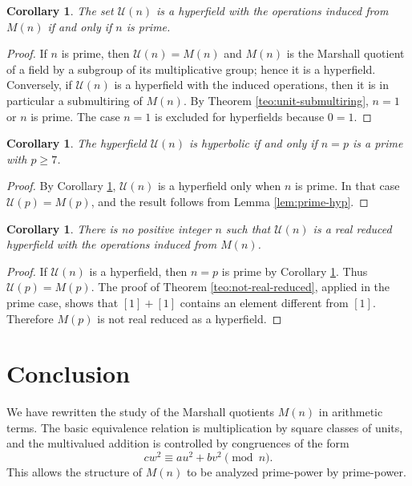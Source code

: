 \documentclass[a4paper,10pt]{article}
\newtheorem{cor}[teo]{Corollary}
\newcommand{\cl}[1]{\left[#1\right]}
\newcommand{\U}{\mathcal U}
\begin{document}
\begin{cor}\label{cor:unit-hyperfield}
The set $\U(n)$ is a hyperfield with the operations induced from $M(n)$ if and only if $n$ is prime.
\end{cor}

\begin{proof}
If $n$ is prime, then $\U(n)=M(n)$ and $M(n)$ is the Marshall quotient of a field by a subgroup of its multiplicative group; hence it is a hyperfield.  Conversely, if $\U(n)$ is a hyperfield with the induced operations, then it is in particular a submultiring of $M(n)$.  By Theorem \ref{teo:unit-submultiring}, $n=1$ or $n$ is prime.  The case $n=1$ is excluded for hyperfields because $0=1$.
\end{proof}

\begin{cor}\label{cor:unit-hyp}
The hyperfield $\U(n)$ is hyperbolic if and only if $n=p$ is a prime with $p\ge7$.
\end{cor}

\begin{proof}
By Corollary \ref{cor:unit-hyperfield}, $\U(n)$ is a hyperfield only when $n$ is prime.  In that case $\U(p)=M(p)$, and the result follows from Lemma \ref{lem:prime-hyp}.
\end{proof}

\begin{cor}\label{cor:unit-not-real-reduced}
There is no positive integer $n$ such that $\U(n)$ is a real reduced hyperfield with the operations induced from $M(n)$.
\end{cor}

\begin{proof}
If $\U(n)$ is a hyperfield, then $n=p$ is prime by Corollary \ref{cor:unit-hyperfield}.  Thus $\U(p)=M(p)$.  The proof of Theorem \ref{teo:not-real-reduced}, applied in the prime case, shows that $\cl1+\cl1$ contains an element different from $\cl1$.  Therefore $M(p)$ is not real reduced as a hyperfield.
\end{proof}

\section{Conclusion}

We have rewritten the study of the Marshall quotients $M(n)$ in arithmetic terms.  The basic equivalence relation is multiplication by square classes of units, and the multivalued addition is controlled by congruences of the form
\[
        cw^2\equiv au^2+bv^2\pmod n.
\]
This allows the structure of $M(n)$ to be analyzed prime-power by prime-power.
\end{document}
